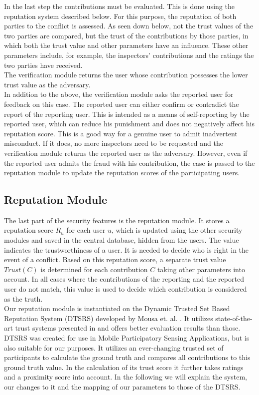 In the last step the contributions must be evaluated. This is done using the reputation system described below. For this purpose, the reputation of both parties to the conflict is assessed. As seen down below, not the trust values of the two parties are compared, but the trust of the contributions by those parties, in which both the trust value and other parameters have an influence. These other parameters include, for example, the inspectors' contributions and the ratings the two parties have received. \\

The verification module returns the user whose contribution possesses the lower trust value as the adversary. \\

In addition to the above, the verification module asks the reported user for feedback on this case. The reported user can either confirm or contradict the report of the reporting user. This is intended as a means of self-reporting by the reported user, which can reduce his punishment and does not negatively affect his reputation score. This is a good way for a genuine user to admit inadvertent misconduct. If it does, no more inspectors need to be requested and the verification module returns the reported user as the adversary. However, even if the reported user admits the fraud with his contribution, the case is passed to the reputation module to update the reputation scores of the participating users.

\subsection{Reputation Module} The last part of the security features is the reputation module. It stores a reputation score $R_u$ for each user $u$, which is updated using the other security modules and saved in the central database, hidden from the users. The value indicates the trustworthiness of a user. It is needed to decide who is right in the event of a conflict. Based on this reputation score, a separate trust value $Trust(C)$ is determined for each contribution $C$ taking other parameters into account. In all cases where the contributions of the reporting and the reported user do not match, this value is used to decide which contribution is considered as the truth. \\

Our reputation module is instantiated on the Dynamic Trusted Set Based Reputation System (DTSRS) developed by Mousa et. al. \cite{mousa2017reputation}. It utilizes state-of-the-art trust systems presented in \cite{mousa2015trust} and offers better evaluation results than those. DTSRS was created for use in Mobile Participatory Sensing Applications, but is also suitable for our purposes. It utilizes an ever-changing trusted set of participants to calculate the ground truth and compares all contributions to this ground truth value. In the calculation of its trust score it further takes ratings and a proximity score into account. In the following we will explain the system, our changes to it and the mapping of our parameters to those of the DTSRS. \\

